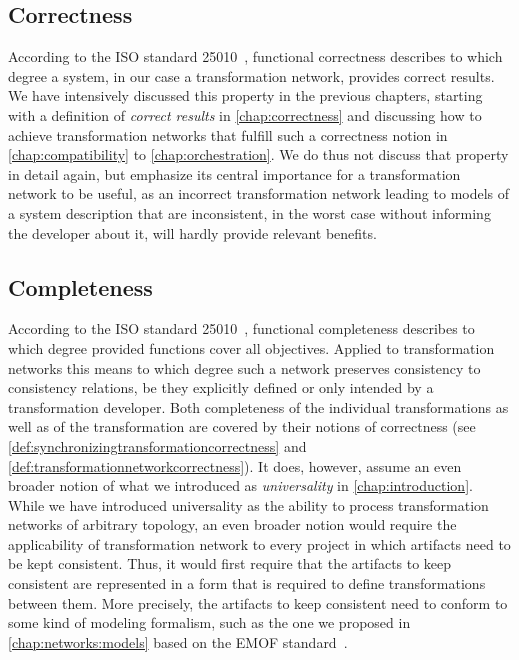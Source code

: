\subsection{Correctness}

According to the ISO standard 25010~\cite{iso25010}, functional correctness describes to which degree a system, in our case a transformation network, provides correct results.
We have intensively discussed this property in the previous chapters, starting with a definition of \emph{correct results} in \autoref{chap:correctness} and discussing how to achieve transformation networks that fulfill such a correctness notion in \autoref{chap:compatibility} to \autoref{chap:orchestration}.
We do thus not discuss that property in detail again, but emphasize its central importance for a transformation network to be useful, as an incorrect transformation network leading to models of a system description that are inconsistent, in the worst case without informing the developer about it, will hardly provide relevant benefits.


\subsection{Completeness}

According to the ISO standard 25010~\cite{iso25010}, functional completeness describes to which degree provided functions cover all objectives.
Applied to transformation networks this means to which degree such a network preserves consistency to consistency relations, be they explicitly defined or only intended by a transformation developer.
Both completeness of the individual transformations as well as of the transformation are covered by their notions of correctness (see \autoref{def:synchronizingtransformationcorrectness} and \autoref{def:transformationnetworkcorrectness}).
It does, however, assume an even broader notion of what we introduced as \emph{universality} in \autoref{chap:introduction}.
While we have introduced universality as the ability to process transformation networks of arbitrary topology, an even broader notion would require the applicability of transformation network to every project in which artifacts need to be kept consistent.
Thus, it would first require that the artifacts to keep consistent are represented in a form that is required to define transformations between them.
More precisely, the artifacts to keep consistent need to conform to some kind of modeling formalism, such as the one we proposed in \autoref{chap:networks:models} based on the \gls{EMOF} standard~\cite{mof}.

